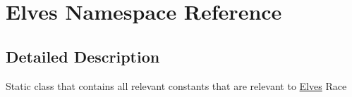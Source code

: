 \hypertarget{namespace_elves}{}\section{Elves Namespace Reference}
\label{namespace_elves}


\subsection{Detailed Description}
Static class that contains all relevant constants that are relevant to \hyperlink{namespace_elves}{Elves} Race 